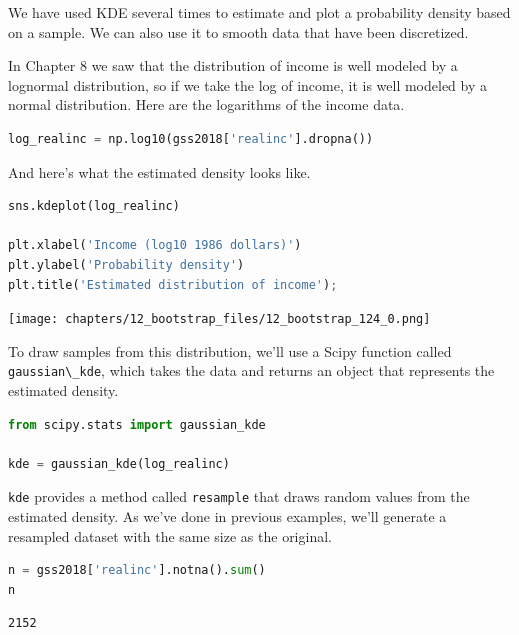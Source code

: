 We have used KDE several times to estimate and plot a probability
density based on a sample. We can also use it to smooth data that have
been discretized.

In Chapter 8 we saw that the distribution of income is well modeled by a
lognormal distribution, so if we take the log of income, it is well
modeled by a normal distribution. Here are the logarithms of the income
data.

\begin{lstlisting}[language=Python,style=source]
log_realinc = np.log10(gss2018['realinc'].dropna())
\end{lstlisting}

And here's what the estimated density looks like.

\begin{lstlisting}[language=Python,style=source]
sns.kdeplot(log_realinc)

plt.xlabel('Income (log10 1986 dollars)')
plt.ylabel('Probability density')
plt.title('Estimated distribution of income');
\end{lstlisting}

\begin{center}
\texttt{[image: chapters/12\_bootstrap\_files/12\_bootstrap\_124\_0.png]}
\end{center}

To draw samples from this distribution, we'll use a Scipy function
called \passthrough{\lstinline!gaussian\_kde!}, which takes the data and
returns an object that represents the estimated density.

\begin{lstlisting}[language=Python,style=source]
from scipy.stats import gaussian_kde

kde = gaussian_kde(log_realinc)
\end{lstlisting}

\passthrough{\lstinline!kde!} provides a method called
\passthrough{\lstinline!resample!} that draws random values from the
estimated density. As we've done in previous examples, we'll generate a
resampled dataset with the same size as the original.

\begin{lstlisting}[language=Python,style=source]
n = gss2018['realinc'].notna().sum()
n
\end{lstlisting}

\begin{lstlisting}[style=output]
2152
\end{lstlisting}

